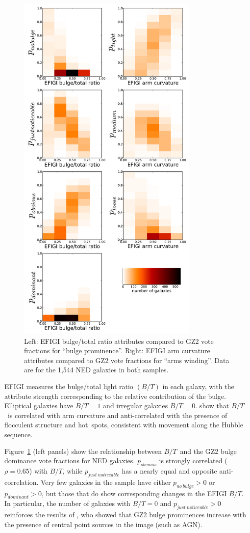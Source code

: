 \documentclass[useAMS,usenatbib]{mn2e}
\newcommand{\bt}{$B/T$}
\begin{document}
\begin{figure}
\includegraphics[angle=0,width=3.5in]{figures/efigi_bulgearms.pdf}
\caption{Left: EFIGI bulge/total ratio attributes compared to GZ2 vote fractions for ``bulge prominence''. Right: EFIGI arm curvature attributes compared to GZ2 vote fractions for ``arms winding''. Data are for the 1,544 NED galaxies in both samples.  
\label{fig-efigi_bulgearms}}
\end{figure}

EFIGI measures the bulge/total light ratio $(B/T)$ in each galaxy, with the attribute strength corresponding to the relative contribution of the bulge. Elliptical galaxies have $B/T=1$ and irregular galaxies $B/T=0$. \citet{bai11} show that \bt~is correlated with arm curvature and anti-correlated with the presence of flocculent structure and hot~spots, consistent with movement along the Hubble sequence.  

Figure~\ref{fig-efigi_bulgearms} (left panels) show the relationship between \bt~and the GZ2 bulge dominance vote fractions for NED galaxies. $p_{obvious}$ is strongly correlated ($\rho=0.65$) with \bt, while $p_{just~noticeable}$ has a nearly equal and opposite anti-correlation. Very few galaxies in the sample have either $p_{no~bulge}>0$ or $p_{dominant}>0$, but those that do show corresponding changes in the EFIGI \bt. In particular, the number of galaxies with $B/T=0$ and $p_{just~noticeable}>0$ reinforces the results of \citet{sim13}, who showed that GZ2 bulge prominences increase with the presence of central point sources in the image (such as AGN). 
\end{document}
